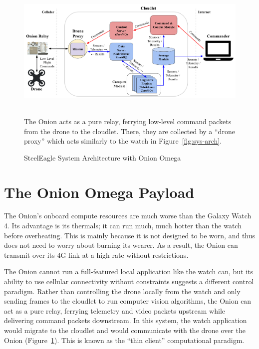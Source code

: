 \begin{figure}
    \centering
    \includegraphics[width=1.0\linewidth]{chapter5/FIGS/arch-onion.png}
    \begin{captext}
    \\[0.1cm]
        \small The Onion acts as a pure relay, ferrying low-level command packets from the drone to the cloudlet. There, they are collected by a ``drone proxy'' which acts similarly to the watch in Figure~\ref{fig:sys-arch}.
    \end{captext}
    \caption{SteelEagle System Architecture with Onion Omega}
    \label{fig:sys-arch-onion}
\end{figure}

\section{The Onion Omega Payload}
\label{sec:onion-omega-payload}

The Onion's onboard compute resources are much worse than the Galaxy Watch 4. Its advantage is its thermals; it can run much, much hotter than the watch before overheating. This is mainly because it is not designed to be worn, and thus does not need to worry about burning its wearer. As a result, the Onion can transmit over its 4G link at a high rate without restrictions.

The Onion cannot run a full-featured local application like the watch can, but its ability to use cellular connectivity without constraints suggests a different control paradigm. Rather than controlling the drone locally from the watch and only sending frames to the cloudlet to run computer vision algorithms, the Onion can act as a pure relay, ferrying telemetry and video packets upstream while delivering command packets downstream. In this system, the watch application would migrate to the cloudlet and would communicate with the drone over the Onion (Figure~\ref{fig:sys-arch-onion}). This is known as the ``thin client'' computational paradigm.

